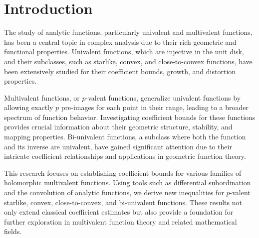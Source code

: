 
\chapter*{Introduction}
The study of analytic functions, particularly univalent and multivalent functions, has been a central topic in complex analysis due to their rich geometric and functional properties. Univalent functions, which are injective in the unit disk, and their subclasses, such as starlike, convex, and close-to-convex functions, have been extensively studied for their coefficient bounds, growth, and distortion properties.  

Multivalent functions, or $p$-valent functions, generalize univalent functions by allowing exactly $p$ pre-images for each point in their range, leading to a broader spectrum of function behavior. Investigating coefficient bounds for these functions provides crucial information about their geometric structure, stability, and mapping properties. Bi-univalent functions, a subclass where both the function and its inverse are univalent, have gained significant attention due to their intricate coefficient relationships and applications in geometric function theory.  

This research focuses on establishing coefficient bounds for various families of holomorphic multivalent functions. Using tools such as differential subordination and the convolution of analytic functions, we derive new inequalities for $p$-valent starlike, convex, close-to-convex, and bi-univalent functions. These results not only extend classical coefficient estimates but also provide a foundation for further exploration in multivalent function theory and related mathematical fields.